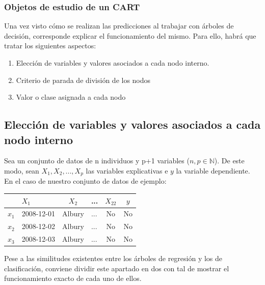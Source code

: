 \documentclass[12pt,twoside]{article}
\begin{document}
\subsubsection{Objetos de estudio de un CART}

Una vez visto cómo se realizan las predicciones al trabajar con árboles de decisión, corresponde explicar el funcionamiento del mismo. Para ello, habrá que tratar los siguientes aspectos:
\begin{enumerate}
\item Elección de variables y valores asociados a cada nodo interno.
\item Criterio de parada de división de los nodos
\item Valor o clase asignada a cada nodo
\end{enumerate}


\subsection{Elección de variables y valores asociados a cada nodo interno} \label{sec: subsec22}
Sea un conjunto de datos de n individuos y p+1 variables ($n,p \in \mathbb{N}$). De este modo, sean $X_1, X_2, ... , X_p$ las variables explicativas e $y$ la variable dependiente. En el caso de nuestro conjunto de datos de ejemplo:
\begin{table}[h]
\centering
\begin{tabular}{rcccc|c}
 & \multicolumn{1}{l}{$X_1$}         & $X_2$                        & ...                      & $X_{22}$ & $y$ \\ \hline
\multicolumn{1}{l|}{$x_1$} & \multicolumn{1}{r|}{2008-12-01} & \multicolumn{1}{l|}{Albury} & \multicolumn{1}{l|}{...} & No        & \multicolumn{1}{l|}{No} \\ \hline
\multicolumn{1}{l|}{$x_2$} & \multicolumn{1}{r|}{2008-12-02} & \multicolumn{1}{l|}{Albury} & \multicolumn{1}{l|}{...} & No        & \multicolumn{1}{l|}{No} \\ \hline
\multicolumn{1}{l|}{$x_3$} & \multicolumn{1}{r|}{2008-12-03} & \multicolumn{1}{l|}{Albury} & \multicolumn{1}{l|}{...} & No        & \multicolumn{1}{l|}{No} \\ \hline
\end{tabular}
\end{table}

Pese a las similitudes existentes entre los árboles de regresión y los de clasificación, conviene dividir este apartado en dos con tal de mostrar el funcionamiento exacto de cada uno de ellos.
\end{document}
